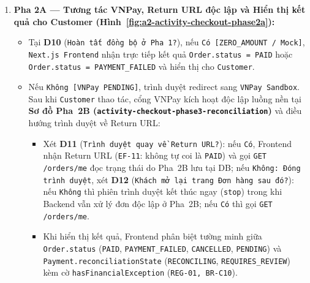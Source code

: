 \begin{enumerate}
\begin{itemize}
\begin{itemize}
      \item \textbf{D7--D9 (\texttt{Dùng chế độ Mock [AF-04]?}):} Nếu \texttt{Có}, xét \textbf{D8} (\texttt{Cho phép chạy Mock?}: nếu \texttt{Không [BR-C09]} trả \texttt{403 MOCK\_PAYMENT\_DISABLED}). Tại \textbf{D9} (\texttt{Thẻ 0002 / Ví 0000 từ chối?}), nếu \texttt{Có} thì commit \texttt{Payment.status = FAILED}, \texttt{Order.status = PAYMENT\_FAILED}; nếu \texttt{Không} thì commit \texttt{Payment.status = SUCCESS}, \texttt{Order.status = PAID}, rồi chuyển sang Pha~2A.
      \item \textbf{Luồng chính VNPay Sandbox (\texttt{D6 = Không} \& \texttt{D7 = Không}):} Xử lý \texttt{POST /payments/vnpay/initiate}, tạo bản ghi \texttt{Payment (Payment.status = PENDING, reconciliationState = SCHEDULED)} với \texttt{vnp\_TxnRef} duy nhất và trả \texttt{paymentUrl} ký \texttt{HMAC-SHA512}.
    \end{itemize}
  \end{itemize}

  \item \textbf{Pha 2A --- Tương tác VNPay, Return URL độc lập và Hiển thị kết quả cho Customer (Hình~\ref{fig:a2-activity-checkout-phase2a}):}
  \begin{itemize}
    \item Tại \textbf{D10} (\texttt{Hoàn tất đồng bộ ở Pha 1?}), nếu \texttt{Có [ZERO\_AMOUNT / Mock]}, \texttt{Next.js Frontend} nhận trực tiếp kết quả \texttt{Order.status = PAID} hoặc \texttt{Order.status = PAYMENT\_FAILED} và hiển thị cho \texttt{Customer}.
    \item Nếu \texttt{Không [VNPay PENDING]}, trình duyệt redirect sang \texttt{VNPay Sandbox}. Sau khi \texttt{Customer} thao tác, cổng VNPay kích hoạt độc lập luồng nền tại \textbf{Sơ đồ Pha~2B (\texttt{activity-checkout-phase3-reconciliation})} và điều hướng trình duyệt về Return URL:
    \begin{itemize}
      \item Xét \textbf{D11} (\texttt{Trình duyệt quay về Return URL?}): nếu \texttt{Có}, Frontend nhận Return URL (\texttt{EF-11}: không tự coi là \texttt{PAID}) và gọi \texttt{GET /orders/me} đọc trạng thái do Pha~2B lưu tại DB; nếu \texttt{Không: Đóng trình duyệt}, xét \textbf{D12} (\texttt{Khách mở lại trang Đơn hàng sau đó?}): nếu \texttt{Không} thì phiên trình duyệt kết thúc ngay (\texttt{stop}) trong khi Backend vẫn xử lý đơn độc lập ở Pha~2B; nếu \texttt{Có} thì gọi \texttt{GET /orders/me}.
      \item Khi hiển thị kết quả, Frontend phân biệt tường minh giữa \texttt{Order.status} (\texttt{PAID}, \texttt{PAYMENT\_FAILED}, \texttt{CANCELLED}, \texttt{PENDING}) và \texttt{Payment.reconciliationState} (\texttt{RECONCILING}, \texttt{REQUIRES\_REVIEW}) kèm cờ \texttt{hasFinancialException} (\texttt{REG-01, BR-C10}).
    \end{itemize}
  \end{itemize}


\end{enumerate}
